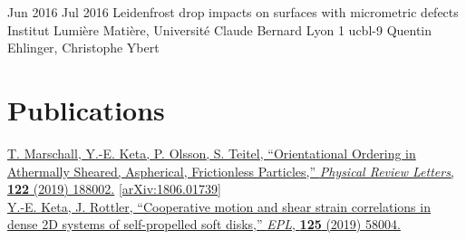 \documentclass[letterpaper]{cvtemplate_en} %
\begin{document}
\begin{cvbody}
\cvitem
	{Jun 2016}
	{Jul 2016}
	{Leidenfrost drop impacts on surfaces with micrometric defects}
	{Institut Lumi\`ere Mati\`ere, Universit\'e Claude Bernard Lyon 1 }
	{ucbl}{}{-9}
	{Quentin Ehlinger, Christophe Ybert}

\end{cvbody}


\section{Publications}

\parbox[t]{\textwidth}{

\href{https://doi.org/10.1103/PhysRevLett.122.188002}{T. Marschall, Y.-E. Keta, P. Olsson, S. Teitel, ``Orientational Ordering in Athermally Sheared, Aspherical, Frictionless Particles,'' \textit{Physical Review Letters}, \textbf{122} (2019) 188002.} \href{https://arxiv.org/abs/1806.01739}{[arXiv:1806.01739]}\\

\href{https://doi.org/10.1209/0295-5075/125/58004}{Y.-E. Keta, J. Rottler, ``Cooperative motion and shear strain correlations in dense 2D systems of self-propelled soft disks,'' \textit{EPL}, \textbf{125} (2019) 58004.}\\

}

\end{document}
